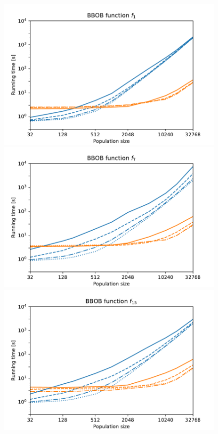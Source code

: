 \begin{figure}[ht!]
    \begin{minipage}[t]{0.32\textwidth}
        \centering
        \includegraphics[width=\textwidth]{img/runs/time_pso2011_fn1_alldim.pdf}
    \end{minipage}
    \hfill
    \begin{minipage}[t]{0.32\textwidth}
        \centering
        \includegraphics[width=\textwidth]{img/runs/time_pso2011_fn7_alldim.pdf}
    \end{minipage}
    \hfill
    \begin{minipage}[t]{0.32\textwidth}
        \centering
        \includegraphics[width=\textwidth]{img/runs/time_pso2011_fn15_alldim.pdf}

\end{minipage}
\end{figure}
